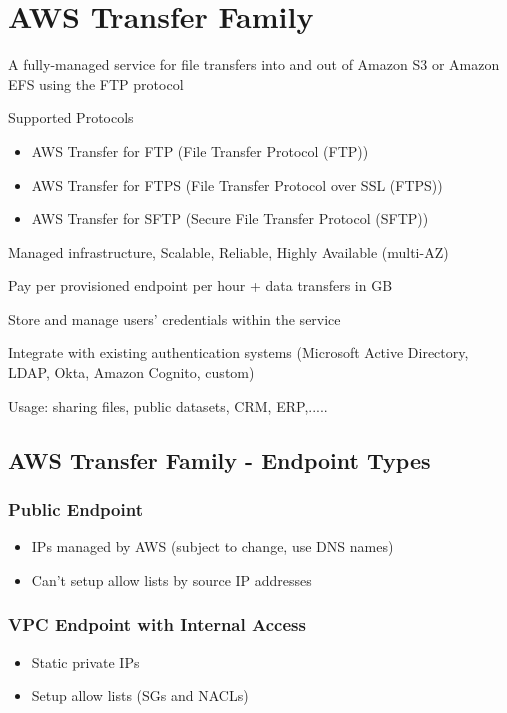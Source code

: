\section{AWS Transfer Family}
\item A fully-managed service for file transfers into and out of Amazon S3 or Amazon EFS using the FTP protocol
\item Supported Protocols
\begin{itemize}
    \item AWS Transfer for FTP (File Transfer Protocol (FTP))
    \item AWS Transfer for FTPS (File Transfer Protocol over SSL (FTPS))
    \item AWS Transfer for SFTP (Secure File Transfer Protocol (SFTP))
\end{itemize}
\item Managed infrastructure, Scalable, Reliable, Highly Available (multi-AZ)
\item Pay per provisioned endpoint per hour + data transfers in GB
\item Store and manage users' credentials within the service
\item Integrate with existing authentication systems (Microsoft Active Directory, LDAP, Okta, Amazon Cognito, custom)
\item Usage: sharing files, public datasets, CRM, ERP,.....


\subsection{AWS Transfer Family - Endpoint Types}

\subsubsection{Public Endpoint}
\begin{itemize}
    \item IPs managed by AWS (subject to change, use DNS names)
    \item Can't setup allow lists by source IP addresses
\end{itemize}

\subsubsection{VPC Endpoint with Internal Access}
\begin{itemize}
    \item Static private IPs
    \item Setup allow lists (SGs and NACLs)
\end{itemize}

